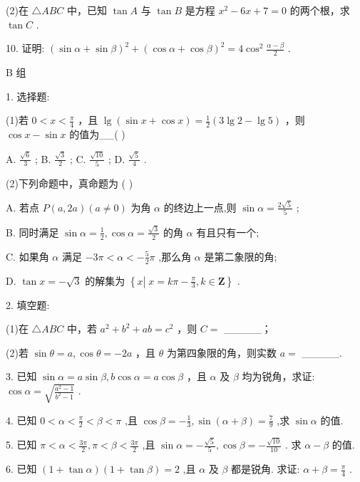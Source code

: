\documentclass[10pt]{article}
\begin{document}
(2)在 \(\bigtriangleup {ABC}\) 中，已知 \(\tan A\) 与 \(\tan B\) 是方程 \({x}^{2} - {6x} + 7 = 0\) 的两个根，求 \(\tan C\) .

10. 证明: \({\left( \sin \alpha  + \sin \beta \right) }^{2} + {\left( \cos \alpha  + \cos \beta \right) }^{2} = 4{\cos }^{2}\frac{\alpha  - \beta }{2}\) .

B 组

1. 选择题:

(1)若 \(0 < x < \frac{\pi }{4}\) ，且 \(\lg \left( {\sin x + \cos x}\right)  = \frac{1}{2}\left( {3\lg 2 - \lg 5}\right)\) ，则 \(\cos x - \sin x\) 的值为\_\_( )

A. \(\frac{\sqrt{6}}{3}\) ; B. \(\frac{\sqrt{3}}{2}\) ; C. \(\frac{\sqrt{10}}{5}\) ; D. \(\frac{\sqrt{5}}{4}\) .

(2)下列命题中，真命题为 ( )

A. 若点 \(P\left( {a,{2a}}\right) \left( {a \neq  0}\right)\) 为角 \(\alpha\) 的终边上一点,则 \(\sin \alpha  = \frac{2\sqrt{5}}{5}\) ;

B. 同时满足 \(\sin \alpha  = \frac{1}{2},\cos \alpha  = \frac{\sqrt{3}}{2}\) 的角 \(\alpha\) 有且只有一个;

C. 如果角 \(\alpha\) 满足 \(- {3\pi } < \alpha  <  - \frac{5}{2}\pi\) ,那么角 \(\alpha\) 是第二象限的角;

D. \(\tan x =  - \sqrt{3}\) 的解集为 \(\left\{  {x\left| {\;x = {k\pi } - \frac{\pi }{3}}\right. ,k \in  \mathbf{Z}}\right\}\) .

2. 填空题:

(1)在 \(\bigtriangleup  {ABC}\) 中，若 \({a}^{2} + {b}^{2} + {ab} = {c}^{2}\) ，则 \(C =\) \_\_\_\_\_；

(2)若 \(\sin \theta  = a,\cos \theta  =  - {2a}\) ，且 \(\theta\) 为第四象限的角，则实数 \(a =\) \_\_\_\_\_.

3. 已知 \(\sin \alpha  = a\sin \beta ,b\cos \alpha  = a\cos \beta\) ，且 \(\alpha\) 及 \(\beta\) 均为锐角，求证: \(\cos \alpha  = \sqrt{\frac{{a}^{2} - 1}{{b}^{2} - 1}}\) .

4. 已知 \(0 < \alpha  < \frac{\pi }{2} < \beta  < \pi\) ,且 \(\cos \beta  =  - \frac{1}{3},\sin \left( {\alpha  + \beta }\right)  = \frac{7}{9}\) ,求 \(\sin \alpha\) 的值.

5. 已知 \(\pi  < \alpha  < \frac{3\pi }{2},\pi  < \beta  < \frac{3\pi }{2}\) ,且 \(\sin \alpha  =  - \frac{\sqrt{5}}{5},\cos \beta  =  - \frac{\sqrt{10}}{10}\) . 求 \(\alpha  - \beta\) 的值.

6. 已知 \(\left( {1 + \tan \alpha }\right) \left( {1 + \tan \beta }\right)  = 2\) ,且 \(\alpha\) 及 \(\beta\) 都是锐角. 求证: \(\alpha  + \beta  = \frac{\pi }{4}\) .
\end{document}

